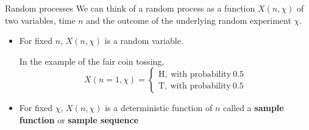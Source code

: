 \documentclass[10pt, handout]{beamer}
\begin{document}
\begin{frame}{Random processes}
We can think of a random process as a function $X(n, \chi)$ of two variables, time $n$ and the outcome of the underlying random experiment $\chi$. 
\begin{itemize}
	\pause\item For fixed $n$, $X(n, \chi)$ is a random variable.
	
	In the example of the fair coin tossing, 
	\begin{equation*}
	X(n=1, \chi) = \begin{cases}
	\mathrm{H},~\text{with probability}~0.5 \\
	\mathrm{T},~\text{with probability}~0.5
	\end{cases}
	\end{equation*}
	\pause\item For fixed $\chi$, $X(n, \chi)$ is a deterministic function of $n$ called a \textbf{sample function} or \textbf{sample sequence}
	

\end{itemize}
\end{frame}
\end{document}
